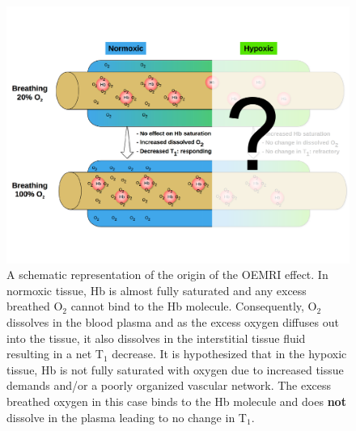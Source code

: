	\begin{figure}
		\begin{center}
		\includegraphics[width=\textwidth]{./intro/intro-images/oemriDark.pdf}
		\caption{A schematic representation of the origin of the OEMRI effect. In normoxic tissue, \acs{Hb} is almost fully saturated and any excess breathed O$_2$ cannot bind to the \acs{Hb} molecule. Consequently, O$_2$ dissolves in the blood plasma and as the excess oxygen diffuses out into the tissue, it also dissolves in the interstitial tissue fluid resulting in a net T$_1$ decrease. It is hypothesized that in the hypoxic tissue, \acs{Hb} is not fully saturated with oxygen due to increased tissue demands and/or a poorly organized vascular network. The excess breathed oxygen in this case binds to the \acs{Hb} molecule and does \textbf{not} dissolve in the plasma leading to no change in T$_1$.}
		\label{oemri}
		\end{center}
	\end{figure}

